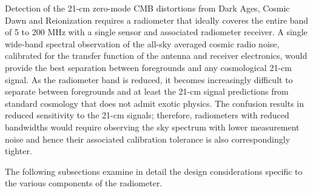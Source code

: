 Detection of the 21-cm zero-mode CMB distortions from Dark Ages, Cosmic Dawn and Reionization requires a radiometer that ideally coveres the entire band of 5 to 200 MHz with a single sensor and associated radiometer receiver.  A single wide-band spectral observation of the all-sky averaged cosmic radio noise, calibrated for the transfer function of the antenna and receiver electronics, would provide the best separation between foregrounds and any cosmological 21-cm signal.  As the radiometer band is reduced, it becomes increasingly difficult to separate between foregrounds and at least the 21-cm signal predictions from standard cosmology that does not admit exotic physics.  The confusion results in reduced sensitivity to the 21-cm signals; therefore, radiometers with reduced bandwidths would require observing the sky spectrum with lower measurement noise and hence their associated calibration tolerance is also correspondingly tighter.

The following subsections examine in detail the design considerations specific to the various components of the radiometer.

